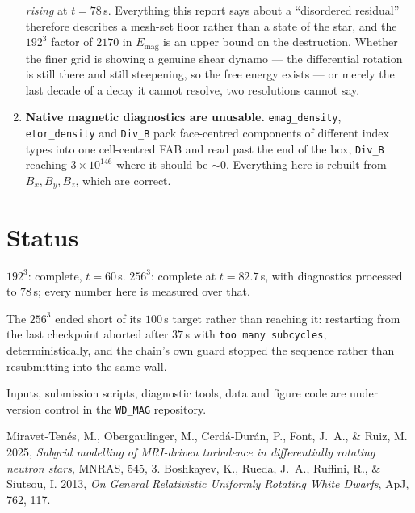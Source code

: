 \documentclass[11pt,a4paper]{article}
\newcommand{\Emag}{E_{\mathrm{mag}}}
\begin{document}
\begin{enumerate}
      \emph{rising} at $t = 78$\,s. Everything this report says about a
      ``disordered residual'' therefore describes a mesh-set floor rather than
      a state of the star, and the $192^3$ factor of $2170$ in $\Emag$ is an
      upper bound on the destruction. Whether the finer grid is showing a
      genuine shear dynamo --- the differential rotation is still there and
      still steepening, so the free energy exists --- or merely the last decade
      of a decay it cannot resolve, two resolutions cannot say.
\item \textbf{Native magnetic diagnostics are unusable.} \texttt{emag\_density},
      \texttt{etor\_density} and \texttt{Div\_B} pack face-centred components of
      different index types into one cell-centred FAB and read past the end of
      the box, \texttt{Div\_B} reaching $3\times10^{146}$ where it should be
      $\sim0$. Everything here is rebuilt from $B_x,B_y,B_z$, which are correct.
\end{enumerate}

\section*{Status}

$192^3$: complete, $t = 60$\,s. \quad $256^3$: complete at $t = 82.7$\,s, with
diagnostics processed to $78$\,s; every number here is measured over that.

The $256^3$ ended short of its $100$\,s target rather than reaching it:
restarting from the last checkpoint aborted after $37$\,s with
\texttt{too many subcycles}, deterministically, and the chain's own guard
stopped the sequence rather than resubmitting into the same wall.

Inputs, submission scripts, diagnostic tools, data and figure code are under
version control in the \texttt{WD\_MAG} repository.

\begin{thebibliography}{9}
Miravet-Ten\'es, M., Obergaulinger, M., Cerd\'a-Dur\'an, P., Font, J.~A., \&
Ruiz, M. 2025, \textit{Subgrid modelling of MRI-driven turbulence in
differentially rotating neutron stars}, MNRAS, 545, 3.
Boshkayev, K., Rueda, J.~A., Ruffini, R., \& Siutsou, I. 2013,
\textit{On General Relativistic Uniformly Rotating White Dwarfs},
ApJ, 762, 117.
\end{thebibliography}
\end{document}
